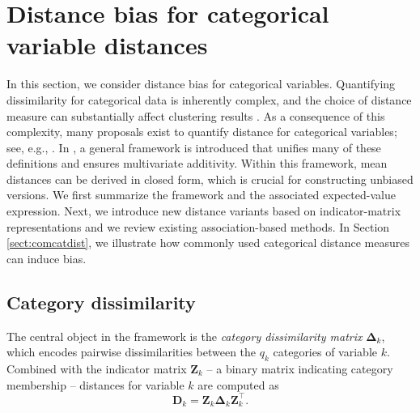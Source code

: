 \documentclass[12pt]{article}
\begin{document}
\section{Distance bias for categorical variable distances} \label{sect:catdist}
In this section, we consider distance bias for categorical variables. Quantifying dissimilarity for categorical data is inherently complex, and the choice of distance measure can substantially affect clustering results \parencite{Amiri:2018}. As a consequence of this complexity, many proposals exist to quantify distance for categorical variables; see, e.g., \textcite{BCK:2008,SR:2019,vandeveldenetal2024}. In \textcite{vandeveldenetal2024}, a general framework is introduced that unifies many of these definitions and ensures multivariate additivity. Within this framework, mean distances can be derived in closed form, which is crucial for constructing unbiased versions. We first summarize the framework and the associated expected-value expression. Next, we introduce new distance variants based on indicator-matrix representations and we review existing association-based methods. In Section \ref{sect:comcatdist}, we illustrate how commonly used categorical distance measures can induce bias.

\subsection{Category dissimilarity} \label{sect:catdissim}
The central object in the framework is the \emph{category dissimilarity matrix} $\bm{\Delta}_k$, which encodes pairwise dissimilarities between the $q_k$ categories of variable $k$.
Combined with the indicator matrix $\mathbf{Z}_k$ -- a binary matrix indicating category membership -- distances for variable $k$ are computed as
\begin{equation}\label{ZDeltaZ'}
    \mathbf{D}_k = \mathbf{Z}_k \bm{\Delta}_k \mathbf{Z}_k^{\top}.
\end{equation}
\end{document}
